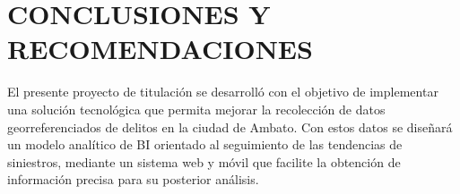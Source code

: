\chapter{CONCLUSIONES Y RECOMENDACIONES}

El presente proyecto de titulación se desarrolló con el objetivo de implementar una solución tecnológica
que permita mejorar la recolección de datos georreferenciados de delitos en la ciudad de Ambato. Con
estos datos se diseñará un modelo analítico de BI orientado al seguimiento de las tendencias de siniestros,
mediante un sistema web y móvil que facilite la obtención de información precisa para su posterior análisis.



